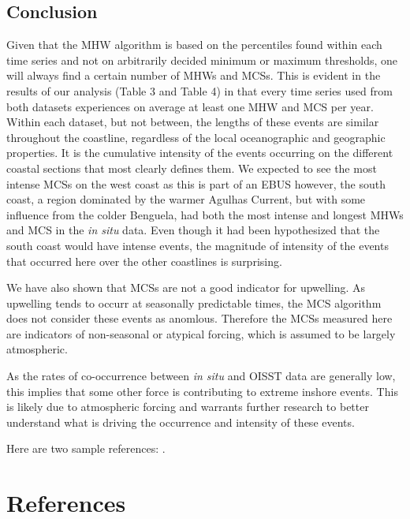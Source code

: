 \documentclass[a4paper,10pt,review]{elsarticle}
\begin{document}
\subsection{Conclusion}
Given that the MHW algorithm is based on the percentiles found within each time series and not on arbitrarily decided minimum or maximum thresholds, one will always find a certain number of MHWs and MCSs. This is evident in the results of our analysis (Table 3 and Table 4) in that every time series used from both datasets experiences on average at least one MHW and MCS per year. Within each dataset, but not between, the lengths of these events are similar throughout the coastline, regardless of the local oceanographic and geographic properties.  It is the cumulative intensity of the events occurring on the different coastal sections that most clearly defines them. We expected to see the most intense MCSs on the west coast as this is part of an EBUS however, the south coast, a region dominated by the warmer Agulhas Current, but with some influence from the colder Benguela, had both the most intense and longest MHWs and MCS in the \emph{in situ} data. Even though it had been hypothesized that the south coast would have intense events, the magnitude of intensity of the events that occurred here over the other coastlines is surprising. 

We have also shown that MCSs are not a good indicator for upwelling. As upwelling tends to occurr at seasonally predictable times, the MCS algorithm does not consider these events as anomlous. Therefore the MCSs measured here are indicators of non-seasonal or atypical forcing, which is assumed to be largely atmospheric.

As the rates of co-occurrence between \emph{in situ} and OISST data are generally low, this implies that some other force is contributing to extreme inshore events. This is likely due to atmospheric forcing and warrants further research to better understand what is driving the occurrence and intensity of these events.

Here are two sample references: \cite{Feynman1963118,Dirac1953888}.

\section*{References}


\end{document}
